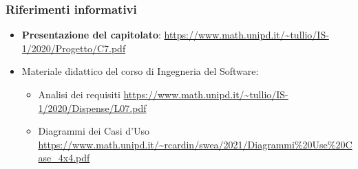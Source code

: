 \subsubsection{Riferimenti informativi}
\begin{itemize}
\item \textbf{Presentazione del capitolato}:\newline
      \url{https://www.math.unipd.it/~tullio/IS-1/2020/Progetto/C7.pdf}
\item Materiale didattico del corso di Ingegneria del Software:
    \begin{itemize}
    \item Analisi dei requisiti\newline
      \url{https://www.math.unipd.it/~tullio/IS-1/2020/Dispense/L07.pdf}
    \item Diagrammi dei Casi d'Uso\newline
      \url{https://www.math.unipd.it/~rcardin/swea/2021/Diagrammi\%20Use\%20Case_4x4.pdf}
    \end{itemize}
\end{itemize}
